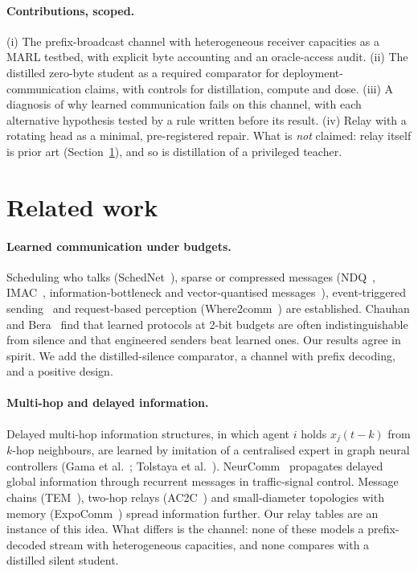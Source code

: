 \documentclass[11pt]{article}
\theoremstyle{definition}
\begin{document}
\paragraph{Contributions, scoped.}
(i) The prefix-broadcast channel with heterogeneous receiver capacities as a MARL testbed, with explicit byte accounting
and an oracle-access audit. (ii) The distilled zero-byte student as a required comparator for deployment-communication
claims, with controls for distillation, compute and dose. (iii) A diagnosis of why learned communication fails on this
channel, with each alternative hypothesis tested by a rule written before its result. (iv) Relay with a rotating head as
a minimal, pre-registered repair. What is \emph{not} claimed: relay itself is prior art (Section~\ref{sec:related}), and
so is distillation of a privileged teacher.

\section{Related work}\label{sec:related}
\paragraph{Learned communication under budgets.} Scheduling who talks (SchedNet~\cite{schednet}), sparse or compressed
messages (NDQ~\cite{ndq}, IMAC~\cite{imac}, information-bottleneck and vector-quantised messages~\cite{ibvq}),
event-triggered sending~\cite{etcnet} and request-based perception (Where2comm~\cite{where2comm}) are established.
Chauhan and Bera~\cite{chauhan2026} find that learned protocols at 2-bit budgets are often indistinguishable from
silence and that engineered senders beat learned ones. Our results agree in spirit. We add the distilled-silence
comparator, a channel with prefix decoding, and a positive design.
\paragraph{Multi-hop and delayed information.} Delayed multi-hop information structures, in which agent $i$ holds
$x_j(t-k)$ from $k$-hop neighbours, are learned by imitation of a centralised expert in graph neural controllers (Gama et
al.~\cite{gama2022}; Tolstaya et al.~\cite{tolstaya2019}). NeurComm~\cite{neurcomm} propagates delayed global information
through recurrent messages in traffic-signal control. Message chains (TEM~\cite{tem}), two-hop relays (AC2C~\cite{ac2c})
and small-diameter topologies with memory (ExpoComm~\cite{expocomm}) spread information further. Our relay tables are an
instance of this idea. What differs is the channel: none of these models a prefix-decoded stream with heterogeneous
capacities, and none compares with a distilled silent student.
\end{document}
